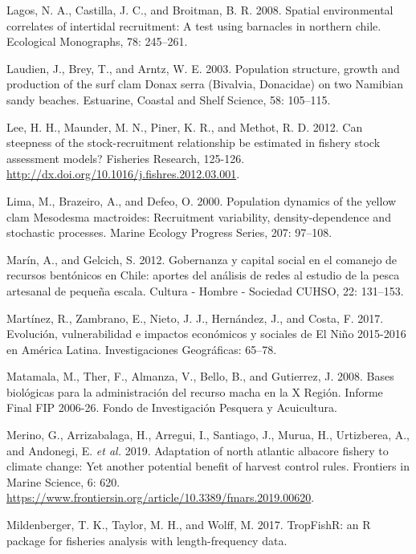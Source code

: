 \documentclass[12pt]{article}
\begin{document}
\leavevmode\hypertarget{ref-Lagos2008}{}%
Lagos, N. A., Castilla, J. C., and Broitman, B. R. 2008. Spatial
environmental correlates of intertidal recruitment: A test using
barnacles in northern chile. Ecological Monographs, 78: 245--261.

\leavevmode\hypertarget{ref-Laudien2003}{}%
Laudien, J., Brey, T., and Arntz, W. E. 2003. Population structure,
growth and production of the surf clam Donax serra (Bivalvia, Donacidae)
on two Namibian sandy beaches. Estuarine, Coastal and Shelf Science, 58:
105--115.

\leavevmode\hypertarget{ref-Lee2012}{}%
Lee, H. H., Maunder, M. N., Piner, K. R., and Methot, R. D. 2012. Can
steepness of the stock-recruitment relationship be estimated in fishery
stock assessment models? Fisheries Research, 125-126.
\url{http://dx.doi.org/10.1016/j.fishres.2012.03.001}.

\leavevmode\hypertarget{ref-Lima2000}{}%
Lima, M., Brazeiro, A., and Defeo, O. 2000. Population dynamics of the
yellow clam Mesodesma mactroides: Recruitment variability,
density-dependence and stochastic processes. Marine Ecology Progress
Series, 207: 97--108.

\leavevmode\hypertarget{ref-Marin2012}{}%
Marín, A., and Gelcich, S. 2012. Gobernanza y capital social en el
comanejo de recursos bentónicos en Chile: aportes del análisis de redes
al estudio de la pesca artesanal de pequeña escala. Cultura - Hombre -
Sociedad CUHSO, 22: 131--153.

\leavevmode\hypertarget{ref-Martinez2017}{}%
Martínez, R., Zambrano, E., Nieto, J. J., Hernández, J., and Costa, F.
2017. Evolución, vulnerabilidad e impactos económicos y sociales de El
Niño 2015-2016 en América Latina. Investigaciones Geográficas: 65--78.

\leavevmode\hypertarget{ref-Matamala2008}{}%
Matamala, M., Ther, F., Almanza, V., Bello, B., and Gutierrez, J. 2008.
Bases biológicas para la administración del recurso macha en la X
Región. Informe Final FIP 2006-26. Fondo de Investigación Pesquera y
Acuicultura.

\leavevmode\hypertarget{ref-Merino2019}{}%
Merino, G., Arrizabalaga, H., Arregui, I., Santiago, J., Murua, H.,
Urtizberea, A., and Andonegi, E. \emph{et al.} 2019. Adaptation of north
atlantic albacore fishery to climate change: Yet another potential
benefit of harvest control rules. Frontiers in Marine Science, 6: 620.
\url{https://www.frontiersin.org/article/10.3389/fmars.2019.00620}.

\leavevmode\hypertarget{ref-Mildenberger2017}{}%
Mildenberger, T. K., Taylor, M. H., and Wolff, M. 2017. TropFishR: an R
package for fisheries analysis with length-frequency data.
\end{document}
